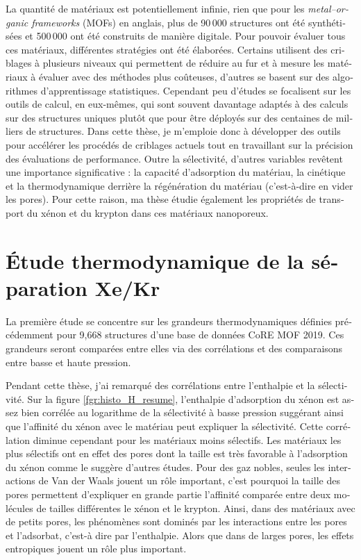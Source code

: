\documentclass[thesis]{subfiles}
\begin{document}
\begin{otherlanguage}{french}
La quantité de matériaux est potentiellement infinie, rien que pour les \emph{metal--organic frameworks} (MOFs) en anglais, plus de 90\,000 structures ont été synthétisées et 500\,000 ont été construits de manière digitale. Pour pouvoir évaluer tous ces matériaux, différentes stratégies ont été élaborées. Certains utilisent des criblages à plusieurs niveaux qui permettent de réduire au fur et à mesure les matériaux à évaluer avec des méthodes plus coûteuses, d'autres se basent sur des algorithmes d'apprentissage statistiques. Cependant peu d'études se focalisent sur les outils de calcul, en eux-mêmes, qui sont souvent davantage adaptés à des calculs sur des structures uniques plutôt que pour être déployés sur des centaines de milliers de structures. Dans cette thèse, je m'emploie donc à développer des outils pour accélérer les procédés de criblages actuels tout en travaillant sur la précision des évaluations de performance. Outre la sélectivité, d'autres variables revêtent une importance significative : la capacité d'adsorption du matériau, la cinétique et la thermodynamique derrière la régénération du matériau (c'est-à-dire en vider les pores). Pour cette raison, ma thèse étudie également les propriétés de transport du xénon et du krypton dans ces matériaux nanoporeux. 

\section*{\'Etude thermodynamique de la séparation Xe/Kr}

La première étude se concentre sur les grandeurs thermodynamiques définies précédemment pour 9,668 structures d'une base de données CoRE MOF 2019. Ces grandeurs seront comparées entre elles via des corrélations et des comparaisons entre basse et haute pression.

Pendant cette thèse, j'ai remarqué des corrélations entre l'enthalpie et la sélectivité. Sur la figure \ref{fgr:histo_H_resume}, l'enthalpie d'adsorption du xénon est assez bien corrélée au logarithme de la sélectivité à basse pression suggérant ainsi que l'affinité du xénon avec le matériau peut expliquer la sélectivité. Cette corrélation diminue cependant pour les matériaux moins sélectifs. Les matériaux les plus sélectifs ont en effet des pores dont la taille est très favorable à l'adsorption du xénon comme le suggère d'autres études. Pour des gaz nobles, seules les interactions de Van der Waals jouent un rôle important, c'est pourquoi la taille des pores permettent d'expliquer en grande partie l'affinité comparée entre deux molécules de tailles différentes le xénon et le krypton. Ainsi, dans des matériaux avec de petits pores, les phénomènes sont dominés par les interactions entre les pores et l'adsorbat, c'est-à dire par l'enthalpie. Alors que dans de larges pores, les effets entropiques jouent un rôle plus important.


\end{otherlanguage}
\end{document}

